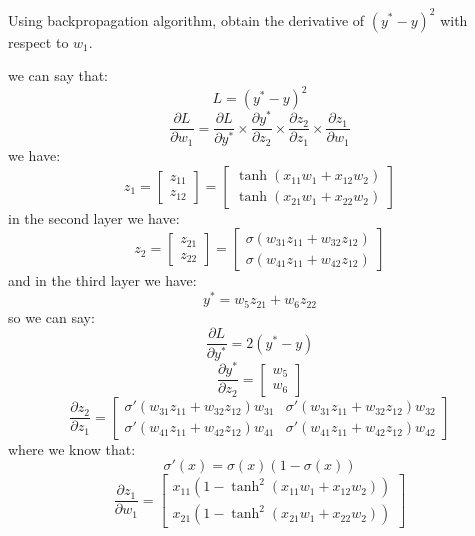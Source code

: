 Using backpropagation algorithm, obtain the derivative of \((y^* - y)^2\) with respect to \(w_1\).
\begin{qsolve}
    \begin{qsolve}[]
        we can say that:
        $$L = (y^* - y)^2$$
        $$\frac{\partial L}{\partial w_1} = \frac{\partial L}{\partial y^*} \times \frac{\partial y^*}{\partial z_2} \times \frac{\partial z_2}{\partial z_1} \times \frac{\partial z_1}{\partial w_1}$$
        we have:
        $$z_1 = \begin{bmatrix}
        z_{11}\\
        z_{12}
        \end{bmatrix} = \begin{bmatrix}
        \tanh(x_{11}w_1 + x_{12}w_2)\\
        \tanh(x_{21}w_1 + x_{22}w_2)
        \end{bmatrix}$$
        in the second layer we have:
        $$z_2 = \begin{bmatrix}
        z_{21}\\
        z_{22}
        \end{bmatrix} = \begin{bmatrix}
        \sigma(w_{31}z_{11} + w_{32}z_{12})\\
        \sigma(w_{41}z_{11} + w_{42}z_{12})
        \end{bmatrix}$$
        and in the third layer we have:
        $$y^* = w_5z_{21} + w_6z_{22}$$
        so we can say:
        $$\frac{\partial L}{\partial y^*} = 2(y^* - y)$$
        $$\frac{\partial y^*}{\partial z_2} = \begin{bmatrix}  
        w_5\\
        w_6
        \end{bmatrix}$$
        $$\frac{\partial z_2}{\partial z_1} = \begin{bmatrix}
        \sigma'(w_{31}z_{11} + w_{32}z_{12})w_{31} & \sigma'(w_{31}z_{11} + w_{32}z_{12})w_{32}\\
        \sigma'(w_{41}z_{11} + w_{42}z_{12})w_{41} & \sigma'(w_{41}z_{11} + w_{42}z_{12})w_{42}
        \end{bmatrix}$$
        where we know that:
        \splitqsolve[\splitqsolve]
        $$\sigma'(x) = \sigma(x)(1 - \sigma(x))$$
        $$\frac{\partial z_1}{\partial w_1} = \begin{bmatrix}
        x_{11}(1 - \tanh^2(x_{11}w_1 + x_{12}w_2))\\
        x_{21}(1 - \tanh^2(x_{21}w_1 + x_{22}w_2))
        \end{bmatrix}$$

\end{qsolve}
\end{qsolve}
